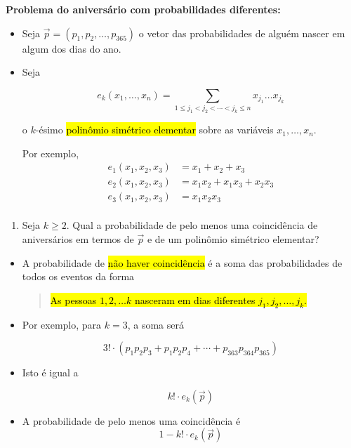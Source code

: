 \documentclass[
  11pt]{report}
\providecommand{\tightlist}{%
  \setlength{\itemsep}{0pt}\setlength{\parskip}{0pt}}
\begin{document}
\begin{rmdbox}

\textbf{Problema do aniversário com probabilidades diferentes:}

\begin{itemize}
\item
  Seja $\vec p = (p_1, p_2, \ldots, p_{365})$ o vetor das probabilidades de alguém nascer em algum dos dias do ano.
\item
  Seja

  \[
  e_k(x_1, \ldots, x_n) = 
  \sum_{1 \leq j_1 < j_2 < \cdots < j_k \leq n}
  \!\!\!\!\!\!\!\!\!\!\!\!\!\! x_{j_1} \ldots x_{j_k}
  \]

  o $k$-ésimo {\hl{polinômio simétrico elementar}} sobre as variáveis $x_1, \ldots, x_n$.

  Por exemplo,
  \[
  \begin{aligned}
    e_1(x_1, x_2, x_3) &= x_1 + x_2 + x_3 \\
    e_2(x_1, x_2, x_3) &= x_1x_2 + x_1x_3 + x_2x_3 \\
    e_3(x_1, x_2, x_3) &= x_1x_2x_3 \\
  \end{aligned}
  \]
\end{itemize}

\begin{enumerate}
\def\labelenumi{\alph{enumi}.}
\tightlist
\item
  Seja $k \geq 2$. Qual a probabilidade de pelo menos uma coincidência de aniversários em termos de $\vec p$ e de um polinômio simétrico elementar?
\end{enumerate}

\end{rmdbox}

\begin{itemize}
\item
  A probabilidade de {\hl{não haver coincidência}} é a soma das probabilidades de todos os eventos da forma

  \begin{quote}
  {\hl{As pessoas $1, 2, \ldots k$ nasceram em dias diferentes $j_1, j_2, \ldots, j_k$.}}
  \end{quote}
\item
  Por exemplo, para $k = 3$, a soma será

  \[
  3! \cdot (p_1 p_2 p_3 + p_1 p_2 p_4 + \cdots + p_{363} p_{364} p_{365})
  \]
\item
  Isto é igual a

  \[
  k! \cdot e_k(\vec p)
  \]
\item
  A probabilidade de pelo menos uma coincidência é
  \[
  1 - k! \cdot e_k(\vec p)
  \]
\end{itemize}
\end{document}
